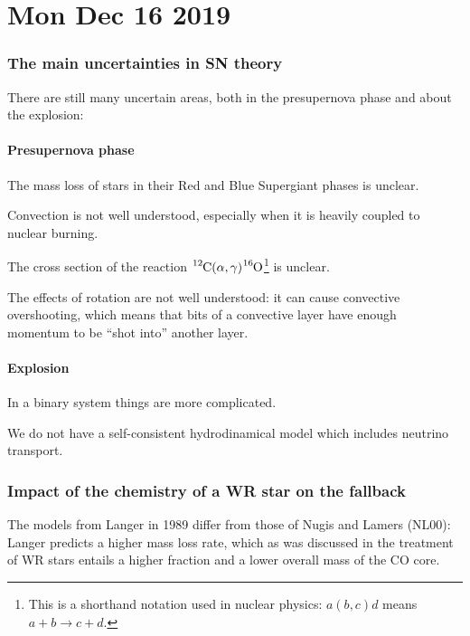 \documentclass[main.tex]{subfiles}
\begin{document}
\section*{Mon Dec 16 2019}

\subsubsection{The main uncertainties in SN theory}

There are still many uncertain areas, both in the presupernova phase and about the explosion:

\paragraph{Presupernova phase}

The mass loss of stars in their Red and Blue Supergiant phases is unclear.

Convection is not well understood, especially when it is heavily coupled to nuclear burning. 

The cross section of the reaction \(\ce{^{12}C} (\alpha , \gamma ) \ce{^{16}O}\)\footnote{This is a shorthand notation used in nuclear physics: \(a(b,c)d\) means \(a + b \rightarrow c+d\).} is unclear.

The effects of rotation are not well understood: it can cause convective overshooting, which means that bits of a convective layer have enough momentum to be ``shot into'' another layer.

\paragraph{Explosion}

In a binary system things are more complicated. 

We do not have a self-consistent hydrodinamical model which includes neutrino transport.



\subsubsection{Impact of the chemistry of a WR star on the fallback}

The models from Langer in 1989 differ from those of Nugis and Lamers (NL00): Langer predicts a higher mass loss rate, which as was discussed in the treatment of WR stars entails a higher  fraction and a lower overall mass of the CO core.
\end{document}

